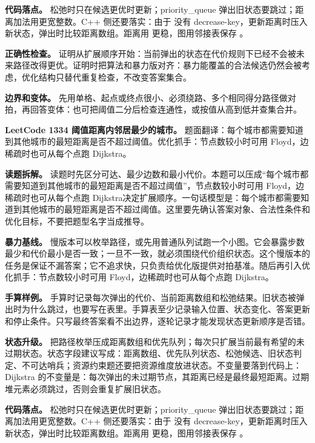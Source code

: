 \textbf{代码落点。} 松弛时只在候选更优时更新；priority\_queue 弹出旧状态要跳过；距离加法用更宽整数。C++ 侧还要落实：由于  没有 decrease-key，更新距离时压入新状态，弹出时比较距离数组。距离用  更稳，图用邻接表保存 。

\textbf{正确性检查。} 证明从扩展顺序开始：当前弹出的状态在代价规则下已经不会被未来路径改得更优。证明时把算法和暴力版对齐：暴力能覆盖的合法候选仍然会被考虑，优化结构只替代重复检查，不改变答案集合。

\textbf{边界和变体。} 先用单格、起点或终点很小、必须绕路、多个相同得分路径做对拍，再回答变体：也可把阈值二分后检查连通性，或按值从高到低并查集合并。

\noindent\textbf{LeetCode 1334 阈值距离内邻居最少的城市。} 题面翻译：每个城市都需要知道到其他城市的最短距离是否不超过阈值。优化抓手：节点数较小时可用 Floyd，边稀疏时也可从每个点跑 Dijkstra。

\textbf{读题拆解。} 读题时先区分可达、最少边数和最小代价。本题可以压成“每个城市都需要知道到其他城市的最短距离是否不超过阈值”，节点数较小时可用 Floyd，边稀疏时也可从每个点跑 Dijkstra决定扩展顺序。一句话模型是：每个城市都需要知道到其他城市的最短距离是否不超过阈值。这里要先确认答案对象、合法性条件和优化目标，不要把题型名字当成推导。

\textbf{暴力基线。} 慢版本可以枚举路径，或先用普通队列试跑一个小图。它会暴露步数最少和代价最小是否一致；一旦不一致，就必须围绕代价组织状态。这个慢版本的任务是保证不漏答案；它不追求快，只负责给优化版提供对拍基准。随后再引入优化抓手：节点数较小时可用 Floyd，边稀疏时也可从每个点跑 Dijkstra。

\textbf{手算样例。} 手算时记录每次弹出的代价、当前距离数组和松弛结果。旧状态被弹出时为什么跳过，也要写在表里。手算表至少记录输入位置、状态变化、答案更新和停止条件。只写最终答案看不出边界，逐轮记录才能发现状态更新顺序是否错。

\textbf{状态升级。} 把路径枚举压成距离数组和优先队列；每次只扩展当前最有希望的未过期状态。状态字段建议写成：距离数组、优先队列状态、松弛候选、旧状态判定、不可达哨兵；资源约束题还要把资源维度放进状态。不变量要落到代码上：Dijkstra 的不变量是：每次弹出的未过期节点，其距离已经是最终最短距离。过期堆元素必须跳过，否则会重复扩展旧状态。

\textbf{代码落点。} 松弛时只在候选更优时更新；priority\_queue 弹出旧状态要跳过；距离加法用更宽整数。C++ 侧还要落实：由于  没有 decrease-key，更新距离时压入新状态，弹出时比较距离数组。距离用  更稳，图用邻接表保存 。

